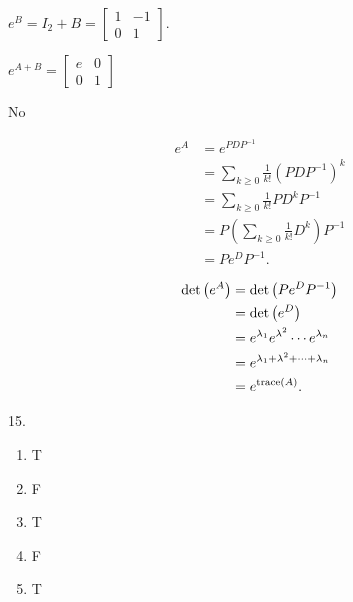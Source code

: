 \begin{multicols}{2}
\item $e^B = I_2 + B = \left[ \begin{array}{cr} 1&-1 \\ 0&1 \end{array} \right]$.

\item $e^{A+B} =  \left[ \begin{array}{cc} e&0 \\ 0&1 \end{array} \right]$

\item No

\ea


\item 
\ba
\item 
\begin{align*}
e^A &= e^{PDP^{-1}} \\
	&= \sum_{k \geq 0} \frac{1}{k!} \left(PDP^{-1}\right)^k \\
	&=  \sum_{k \geq 0} \frac{1}{k!} PD^kP^{-1} \\
	&=  P\left(\sum_{k \geq 0} \frac{1}{k!} D^k\right) P^{-1} \\
	&= Pe^DP^{-1}.
\end{align*}

\item 
\begin{align*}
\det\left(e^A\right) &= \det\left(Pe^DP^{-1}\right) \\
	&=  \det\left(e^D\right) \\
	&= e^{\lambda_1}e^{\lambda^2} \cdots e^{\lambda_n} \\
	&= e^{\lambda_1+\lambda^2+ \cdots + \lambda_n} \\
	&= e^{\text{trace}(A)}.
\end{align*}

\ea

\oee

\be
\item[15.] 
\begin{enumerate}[label=(\alph*), leftmargin=1\parindent]
\item T
\item F
\item T
\item F
\item T

\end{enumerate}

\ee




\end{multicols}
